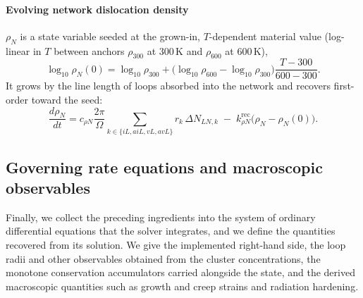 \documentclass{article}
\begin{document}
\paragraph{Evolving network dislocation density}\label{sec:rhoN}
$\rho_N$ is a state variable seeded at the grown-in, $T$-dependent material
value (log-linear in $T$ between anchors $\rho_{300}$ at $300\,$K and
$\rho_{600}$ at $600\,$K),
\begin{equation}
\log_{10}\rho_N(0)=\log_{10}\rho_{300}+\bigl(\log_{10}\rho_{600}-\log_{10}\rho_{300}\bigr)\frac{T-300}{600-300}.
\end{equation}
It grows by the line length of loops absorbed into the network and recovers
first-order toward the seed:
\begin{equation}
\frac{d\rho_N}{dt}=c_{\rho N}\frac{2\pi}{\Omega}\sum_{k\in\{iL,aiL,vL,avL\}} r_k\,\Delta N_{LN,k}
\;-\;k_{\rho N}^{\mathrm{rec}}\bigl(\rho_N-\rho_N(0)\bigr).
\end{equation}

\subsection{Governing rate equations and macroscopic observables}
Finally, we collect the preceding ingredients into the system of ordinary differential equations that the solver integrates, and we define the quantities recovered from its solution. We give the implemented right-hand side, the loop radii and other observables obtained from the cluster concentrations, the monotone conservation accumulators carried alongside the state, and the derived macroscopic quantities such as growth and creep strains and radiation hardening.
\end{document}
